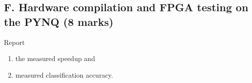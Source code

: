 \subsection{F. Hardware compilation and FPGA testing on the PYNQ (8 marks)}

Report
\begin{enumerate}
    \item the measured speedup and
    \item measured classification accuracy.
\end{enumerate}

